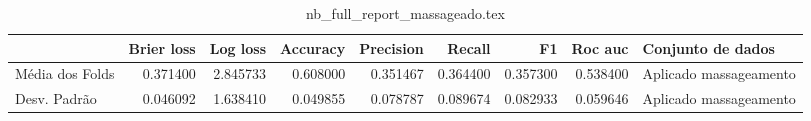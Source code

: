 \begin{table}
\centering
\caption{nb_full_report_massageado.tex}
\label{nb_full_report_massageado.tex}
\begin{tabular}{lrrrrrrrl}
\toprule
{}               &  Brier  loss &  Log loss &  Accuracy  &  Precision  &   Recall  &       F1  &  Roc auc  &       Conjunto de dados \\
\midrule
Média dos Folds &     0.371400 &  2.845733 &   0.608000 &    0.351467 &  0.364400 &  0.357300 &  0.538400 &  Aplicado massageamento \\
Desv. Padrão    &     0.046092 &  1.638410 &   0.049855 &    0.078787 &  0.089674 &  0.082933 &  0.059646 &  Aplicado massageamento \\
\bottomrule
\end{tabular}
\end{table}
